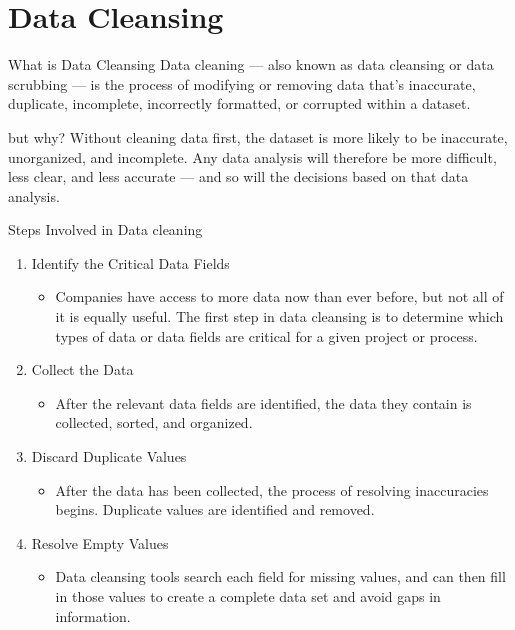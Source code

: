 \documentclass[12pt, aspectratio=169]{beamer}
\begin{document}
\section{Data Cleansing}
\begin{frame}{What is Data Cleansing}
    Data cleaning — also known as data cleansing or data scrubbing — is the process of modifying or removing data that’s inaccurate, duplicate, incomplete, incorrectly formatted, or corrupted within a dataset.

    
    \begin{alertblock} {but why?}
        Without cleaning data first, the dataset is more likely to be inaccurate, unorganized, and incomplete. Any data analysis will therefore be more difficult, less clear, and less accurate — and so will the decisions based on that data analysis. 
    \end{alertblock} 
\end{frame}
\begin{frame}[allowframebreaks]{Steps Involved in Data cleaning}
\begin{enumerate}
    \item Identify the Critical Data Fields
        \begin{itemize}
            \item Companies have access to more data now than ever before, but not all of it is equally useful. The first step in data cleansing is to determine which types of data or data fields are critical for a given project or process.
        \end{itemize}
    \item Collect the Data
        \begin{itemize}
            \item After the relevant data fields are identified, the data they contain is collected, sorted, and organized.
        \end{itemize}
    \item Discard Duplicate Values
        \begin{itemize}
            \item After the data has been collected, the process of resolving inaccuracies begins. Duplicate values are identified and removed.
        \end{itemize}
    \item Resolve Empty Values
        \begin{itemize}
            \item Data cleansing tools search each field for missing values, and can then fill in those values to create a complete data set and avoid gaps in information.
        \end{itemize}
\end{enumerate}
\end{frame}
\end{document}
